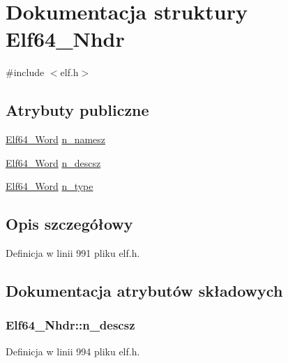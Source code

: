 \hypertarget{struct_elf64___nhdr}{\section{Dokumentacja struktury Elf64\-\_\-\-Nhdr}
\label{struct_elf64___nhdr}
}


{\ttfamily \#include $<$elf.\-h$>$}

\subsection*{Atrybuty publiczne}
\begin{DoxyCompactItemize}
\item 
\hyperlink{elf_8h_aa3aa1920ed115b7ef7e99716fece4401}{Elf64\-\_\-\-Word} \hyperlink{struct_elf64___nhdr_a1169a3f8272ba5265ea3aecdc4974546}{n\-\_\-namesz}
\item 
\hyperlink{elf_8h_aa3aa1920ed115b7ef7e99716fece4401}{Elf64\-\_\-\-Word} \hyperlink{struct_elf64___nhdr_ace700cd855c773a6483e247f18a33350}{n\-\_\-descsz}
\item 
\hyperlink{elf_8h_aa3aa1920ed115b7ef7e99716fece4401}{Elf64\-\_\-\-Word} \hyperlink{struct_elf64___nhdr_abbb820712cc219d235bb7eb3c11eefbe}{n\-\_\-type}
\end{DoxyCompactItemize}


\subsection{Opis szczegółowy}


Definicja w linii 991 pliku elf.\-h.



\subsection{Dokumentacja atrybutów składowych}
\hypertarget{struct_elf64___nhdr_ace700cd855c773a6483e247f18a33350}{
\subsubsection[{n\-\_\-descsz}]{ Elf64\-\_\-\-Nhdr\-::n\-\_\-descsz}}\label{struct_elf64___nhdr_ace700cd855c773a6483e247f18a33350}


Definicja w linii 994 pliku elf.\-h.

